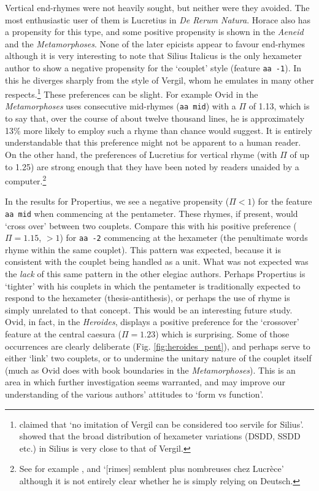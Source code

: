 \documentclass[twocolumn, switch, a4paper]{article} %
\begin{document}
Vertical end-rhymes were not heavily sought, but neither were they avoided.
The most enthusiastic user of them is Lucretius in \emph{De Rerum Natura}.
Horace also has a propensity for this type, and some positive propensity is shown
in the \emph{Aeneid} and the \emph{Metamorphoses}. None of the later epicists
appear to favour end-rhymes although it is very interesting to note that
Silius Italicus is the only hexameter author to show a negative propensity for
the `couplet' style (feature \texttt{aa -1}). In this he diverges sharply from
the style of Vergil, whom he emulates in many other respects.\footnote{
   claimed that `no imitation of Vergil can be
  considered too servile for Silius'.  showed
  that the broad distribution of hexameter variations (DSDD, SSDD etc.) in Silius
  is very close to that of Vergil.
}
These preferences can be slight. For example Ovid in the \emph{Metamorphoses}
uses consecutive mid-rhymes (\texttt{aa mid}) with a $\Pi$ of 1.13, which is
to say that, over the course of about twelve thousand lines, he is
approximately 13\% more likely to employ such a rhyme than chance would
suggest. It is entirely understandable that this preference might not be
apparent to a human reader. On the other hand, the preferences of Lucretius
for vertical rhyme (with $\Pi$ of up to 1.25) are strong enough that they have
been noted by readers unaided by a computer.\footnote{
  See for example , and
   `[rimes] semblent plus nombreuses chez
  Lucrèce' although it is not entirely clear whether he is simply relying on
  Deutsch.
}

In the results for Propertius, we see a negative propensity ($\Pi < 1$) for
the feature \texttt{aa mid} when commencing at the pentameter. These rhymes,
if present, would `cross over' between two couplets. Compare this with his
positive preference ($\Pi = 1.15$, $> 1$) for \texttt{aa -2} commencing at the
hexameter (the penultimate words rhyme within the same couplet). This pattern
was expected, because it is consistent with the couplet being handled as a
unit. What was not expected was the \emph{lack} of this same pattern in the
other elegiac authors. Perhaps Propertius is `tighter' with his couplets in
which the pentameter is traditionally expected to respond to the hexameter
(thesis-antithesis), or perhaps the use of rhyme is simply unrelated to that
concept. This would be an interesting future study. Ovid, in fact, in the
\emph{Heroides}, displays a positive preference for the `crossover' feature at
the central caesura ($\Pi=1.23$) which is surprising. Some of those
occurrences are clearly deliberate (Fig. \ref{fig:heroides_pent}), and perhaps
serve to either `link' two couplets, or to undermine the unitary nature of the
couplet itself (much as Ovid does with book boundaries in the
\emph{Metamorphoses}). This is an area in which further investigation seems
warranted, and may improve our understanding of the various authors' attitudes
to `form vs function'.
\end{document}

